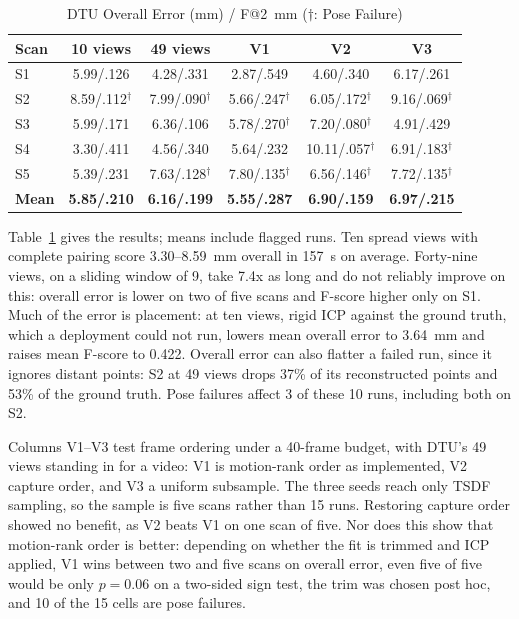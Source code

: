 \documentclass[conference]{IEEEtran}
\begin{document}
\begin{table}[tbp]
\caption{DTU Overall Error (mm) / F@2~mm ($\dagger$: Pose Failure)}
\begin{center}
\footnotesize
\setlength{\tabcolsep}{2.5pt}
\begin{tabular}{|l|c|c|c|c|c|}
\hline
\textbf{Scan} & \textbf{10 views} & \textbf{49 views} & \textbf{V1} & \textbf{V2} & \textbf{V3} \\
\hline
S1 & 5.99/.126 & 4.28/.331 & 2.87/.549 & 4.60/.340 & 6.17/.261 \\
\hline
S2 & 8.59/.112$^\dagger$ & 7.99/.090$^\dagger$ & 5.66/.247$^\dagger$ & 6.05/.172$^\dagger$ & 9.16/.069$^\dagger$ \\
\hline
S3 & 5.99/.171 & 6.36/.106 & 5.78/.270$^\dagger$ & 7.20/.080$^\dagger$ & 4.91/.429 \\
\hline
S4 & 3.30/.411 & 4.56/.340 & 5.64/.232 & 10.11/.057$^\dagger$ & 6.91/.183$^\dagger$ \\
\hline
S5 & 5.39/.231 & 7.63/.128$^\dagger$ & 7.80/.135$^\dagger$ & 6.56/.146$^\dagger$ & 7.72/.135$^\dagger$ \\
\hline
\textbf{Mean} & \textbf{5.85/.210} & \textbf{6.16/.199} & \textbf{5.55/.287} & \textbf{6.90/.159} & \textbf{6.97/.215} \\
\hline
\end{tabular}
\label{tab:dtu}
\end{center}
\end{table}

Table~\ref{tab:dtu} gives the results; means include flagged runs. Ten spread
views with complete pairing score 3.30--8.59~mm overall in 157~s on average.
Forty-nine views, on a sliding window of 9, take 7.4x as long and do not reliably improve on this: overall
error is lower on two of five scans and F-score higher only on S1. Much of the
error is placement: at ten views, rigid ICP against the ground truth, which a
deployment could not run, lowers mean overall error to 3.64~mm and raises mean
F-score to 0.422. Overall error can also flatter a failed run, since it ignores
distant points: S2 at 49 views drops 37\% of its reconstructed points and 53\%
of the ground truth. Pose failures affect 3 of these 10 runs, including both on
S2.

Columns V1--V3 test frame ordering under a 40-frame budget, with DTU's 49 views
standing in for a video: V1 is motion-rank order as implemented, V2 capture order,
and V3 a uniform subsample.
The three seeds reach only TSDF sampling, so the sample is five scans rather than
15 runs.
Restoring capture order showed no benefit, as V2 beats V1 on one scan of five. Nor
does this show that motion-rank order is better: depending on whether the fit is
trimmed and ICP applied, V1 wins between two and five scans on overall error, even
five of five would be only $p = 0.06$ on a two-sided sign test, the trim was chosen
post hoc, and 10 of the 15 cells are pose failures.
\end{document}

